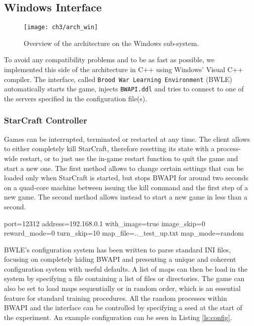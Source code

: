 \subsection{Windows Interface}

\begin{figure}[h]
    \centering
    \texttt{[image: ch3/arch\_win]}
    \caption{Overview of the architecture on the Windows sub-system.}
    \label{fig:arch_win}
\end{figure}

To avoid any compatibility problems and to be as fast as possible, we
implemented this side of the architecture in C++ using Windows' Visual C++
compiler. The interface, called \texttt{Brood War Learning Environment} (BWLE)
automatically starts the game, injects \texttt{BWAPI.ddl} and tries to connect
to one of the servers specified in the configuration file(s).

\subsubsection{StarCraft Controller}

Games can be interrupted, terminated or restarted at any time. The client allows
to either completely kill StarCraft, therefore resetting its state with a
process-wide restart, or to just use the in-game restart function to quit the
game and start a new one. The first method allows to change certain settings
that can be loaded only when StarCraft is started, but stops BWAPI for around
two seconds on a quad-core machine between issuing the kill command and the
first step of a new game. The second method allows instead to start a new game
in less than a second. %

\begin{sflisting}[caption=Example of a BWLE's configuration file. Fields are not
  mandatory and have reasonable default values. Most of the available options
  are not shown., label=ls:config] 
[standard]
port=12312
address=192.168.0.1
with_image=true
image_skip=0
reward_mode=0
turn_skip=10
map_file=..\share\maps_test_up.txt
map_mode=random
\end{sflisting}

BWLE's configuration system has been written to parse standard INI files,
focusing on completely hiding BWAPI and presenting a unique and coherent
configuration system with useful defaults. A list of maps can then be load in
the system by specifying a file containing a list of files or directories. The
game can also be set to load maps sequentially or in random order, which is an
essential feature for standard training procedures. All the random processes
within BWAPI and the interface can be controlled by specifying a seed at the
start of the experiment. An example configuration can be seen in Listing
\ref{ls:config}.

